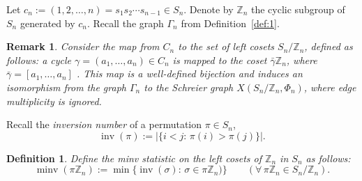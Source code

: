\documentclass[11pt]{amsart}
\newtheorem{observation}[theorem]{Observation}
\newtheorem{definition}[theorem]{Definition}
\newtheorem{remark}[theorem]{Remark}
\numberwithin{equation}{section}
\newcommand{\ZZ}{{\mathbb {Z}}}
\newcommand{\inv}{{\operatorname{inv}}}
\newcommand{\minv}{{\operatorname{minv}}}
\begin{document}
Let $c_n:=(1,2,\dots,n)=s_1s_2\cdots s_{n-1}\in S_n$. 
Denote by $\ZZ_n$ the cyclic subgroup of $S_n$ generated by $c_n$. Recall the graph $\Gamma_n$ from Definition~\ref{def:1}.



\begin{remark}\label{rem:iso}
    Consider the map from $C_n$ to the set of left cosets $S_n/\ZZ_n$, defined as follows: a cycle $\gamma = (a_1,\dots,a_n)\in C_n$ is mapped to the coset $\bar\gamma \ZZ_n$, where $\bar\gamma=[a_1,\dots,a_n]$ . This map is a well-defined bijection and induces an isomorphism from the graph $\Gamma_n$ to the Schreier graph $X(S_n/\ZZ_n, \Phi_n)$, where edge multiplicity is ignored. 
\end{remark}





Recall the {\em inversion number} of a permutation $\pi\in S_n$,
\[
    \inv(\pi) := |\{i<j :\, \pi(i) > \pi(j)\}|.
\]

\begin{definition}\label{def:2}
    Define the {\em minv} statistic on the left cosets of $\ZZ_n$ in $S_n$ as follows:
    \[
        \minv(\pi \ZZ_n) := \min\{ \inv(\sigma) :\, \sigma \in \pi\ZZ_n)\}
        \qquad (\forall\, \pi\ZZ_n \in S_n/\ZZ_n).
    \]
\end{definition}
\end{document}
